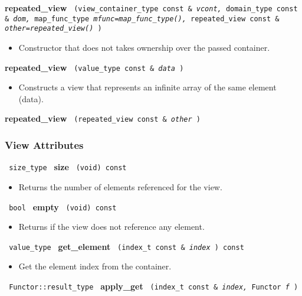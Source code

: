 \noindent
\textbf{repeated\_view}%
\texttt{%
(view\_container\_type const \&
\textit{vcont,}%
domain\_type const \&
\textit{dom,}%
map\_func\_type
\textit{mfunc=map\_func\_type(),}%
repeated\_view const \&
\textit{other=repeated\_view()}%
)
}

\begin{itemize}
\item
Constructor that does not takes ownership over the passed container.
\end{itemize}

\noindent
\textbf{repeated\_view}%
\texttt{%
(value\_type const \&
\textit{data}%
)
}

\begin{itemize}
\item
Constructs a view that represents an infinite array of the same element (data).
\end{itemize}

\noindent
\textbf{repeated\_view}%
\texttt{%
(repeated\_view const \&
\textit{other}%
)
}

\subsubsection{ View Attributes}

\noindent
\texttt{%
size\_type
}
\newline
\textbf{size}%
\texttt{%
(void) const
}

\begin{itemize}
\item
Returns the number of elements referenced for the view.
\end{itemize}

\noindent
\texttt{%
bool
}
\newline
\textbf{empty}%
\texttt{%
(void) const
}

\begin{itemize}
\item
Returns if the view does not reference any element.
\end{itemize}

\noindent
\texttt{%
value\_type
}
\newline
\textbf{get\_element}%
\texttt{%
(index\_t const \&
\textit{index}%
) const
}

\begin{itemize}
\item
Get the element index from the container.
\end{itemize}

\noindent
\texttt{%
Functor::result\_type
}
\newline
\textbf{apply\_get}%
\texttt{%
(index\_t const \&
\textit{index,}%
Functor
\textit{f}%
)
}


